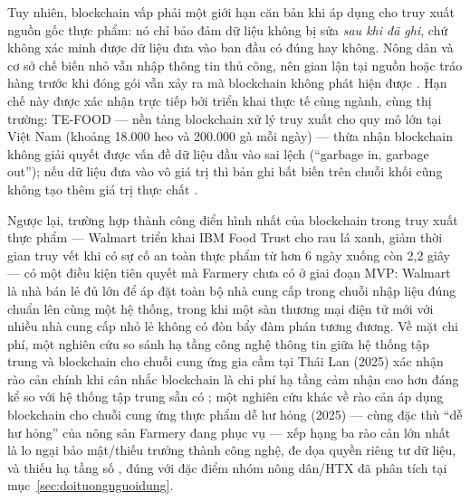 %


Tuy nhiên, blockchain vấp phải một giới hạn căn bản khi áp dụng cho truy xuất nguồn gốc thực phẩm: nó chỉ bảo đảm dữ liệu không bị sửa \emph{sau khi đã ghi}, chứ không xác minh được dữ liệu đưa vào ban đầu có đúng hay không. Nông dân và cơ sở chế biến nhỏ vẫn nhập thông tin thủ công, nên gian lận tại nguồn hoặc tráo hàng trước khi đóng gói vẫn xảy ra mà blockchain không phát hiện được \parencite{bath_blockchain}. Hạn chế này được xác nhận trực tiếp bởi triển khai thực tế cùng ngành, cùng thị trường: TE-FOOD --- nền tảng blockchain xử lý truy xuất cho quy mô lớn tại Việt Nam (khoảng 18.000 heo và 200.000 gà mỗi ngày) --- thừa nhận blockchain không giải quyết được vấn đề dữ liệu đầu vào sai lệch (``garbage in, garbage out''); nếu dữ liệu đưa vào vô giá trị thì bản ghi bất biến trên chuỗi khối cũng không tạo thêm giá trị thực chất \parencite{tefood_blockchain}.

Ngược lại, trường hợp thành công điển hình nhất của blockchain trong truy xuất thực phẩm --- Walmart triển khai IBM Food Trust cho rau lá xanh, giảm thời gian truy vết khi có sự cố an toàn thực phẩm từ hơn 6 ngày xuống còn 2,2 giây \parencite{walmart_ibm_foodtrust} --- có một điều kiện tiên quyết mà Farmery chưa có ở giai đoạn MVP: Walmart là nhà bán lẻ đủ lớn để áp đặt toàn bộ nhà cung cấp trong chuỗi nhập liệu đúng chuẩn lên cùng một hệ thống, trong khi một sàn thương mại điện tử mới với nhiều nhà cung cấp nhỏ lẻ không có đòn bẩy đàm phán tương đương. Về mặt chi phí, một nghiên cứu so sánh hạ tầng công nghệ thông tin giữa hệ thống tập trung và blockchain cho chuỗi cung ứng gia cầm tại Thái Lan (2025) xác nhận rào cản chính khi cân nhắc blockchain là chi phí hạ tầng cảm nhận cao hơn đáng kể so với hệ thống tập trung sẵn có \parencite{thai_broiler_blockchain_2025}; một nghiên cứu khác về rào cản áp dụng blockchain cho chuỗi cung ứng thực phẩm dễ hư hỏng (2025) --- cùng đặc thù ``dễ hư hỏng'' của nông sản Farmery đang phục vụ --- xếp hạng ba rào cản lớn nhất là lo ngại bảo mật/thiếu trưởng thành công nghệ, đe dọa quyền riêng tư dữ liệu, và thiếu hạ tầng số \parencite{perishable_blockchain_barriers_2025}, đúng với đặc điểm nhóm nông dân/HTX đã phân tích tại mục~\ref{sec:doituongnguoidung}.

